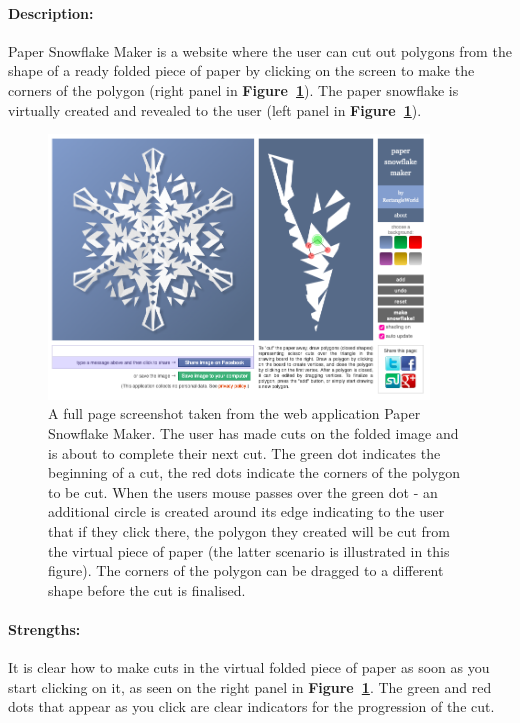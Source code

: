 \documentclass[11pt]{article}
\begin{document}
                \paragraph{Description:}
                Paper Snowflake Maker is a website where the user can cut out polygons from the shape of a ready folded piece of paper by clicking on the screen to make the corners of the polygon (right panel in \textbf{Figure~\ref{fig:paperSnowflakeMaker}}). The paper snowflake is virtually created and revealed to the user (left panel in \textbf{Figure~\ref{fig:paperSnowflakeMaker}}).
                    \begin{figure}[ht]\centering\includegraphics[width=0.9\textwidth]{Images/paperSnowflakeMaker}
                        \caption{
                        \label{fig:paperSnowflakeMaker}
                        A full page screenshot taken from the web application Paper Snowflake Maker. The user has made cuts on the folded image and is about to complete their next cut. The green dot indicates the beginning of a cut, the red dots indicate the corners of the polygon to be cut. When the users mouse passes over the green dot - an additional circle is created around its edge indicating to the user that if they click there, the polygon they created will be cut from the virtual piece of paper (the latter scenario is illustrated in this figure). The corners of the polygon can be dragged to a different shape before the cut is finalised.}
                    \end{figure}
                    
                \paragraph{Strengths:}
                It is clear how to make cuts in the virtual folded piece of paper as soon as you start clicking on it, as seen on the right panel in \textbf{Figure~\ref{fig:paperSnowflakeMaker}}. The green and red dots that appear as you click are clear indicators for the progression of the cut.
                
\end{document}

